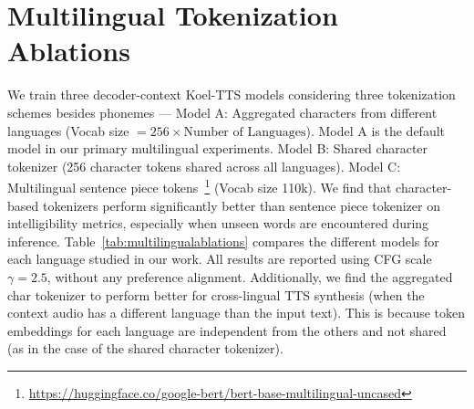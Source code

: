     





\section{Multilingual Tokenization Ablations}
\label{sec:multilingualablations}
We train three decoder-context Koel-TTS models considering three tokenization schemes besides phonemes --- Model A: Aggregated characters from different languages (Vocab size $=256 \times \text{Number of Languages}$). Model A is the default model in our primary multilingual experiments. Model B: Shared character tokenizer (256 character tokens shared across all languages). Model C: Multilingual sentence piece tokens~\footnote{ \url{https://huggingface.co/google-bert/bert-base-multilingual-uncased}} (Vocab size 110k). We find that character-based tokenizers perform significantly better than sentence piece tokenizer on intelligibility metrics, especially when unseen words are encountered during inference. Table~\ref{tab:multilingualablations} compares the different models for each language studied in our work. 
All results are reported using CFG scale $\gamma=2.5$, without any preference alignment. 
Additionally, we find the aggregated char tokenizer to perform better for cross-lingual TTS synthesis (when the context audio has a different language than the input text). This is because token embeddings for each language are independent from the others and not shared (as in the case of the shared character tokenizer).

